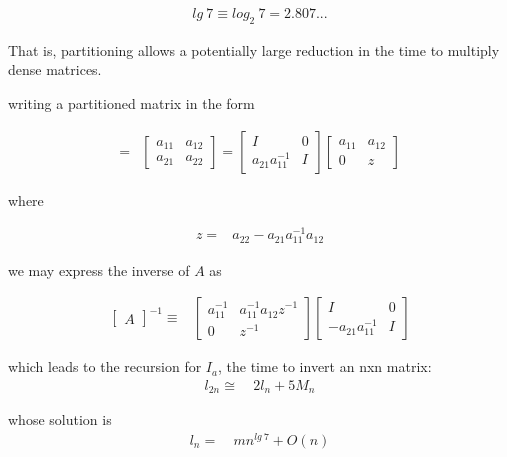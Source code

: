 \begin{align*}
    lg\ 7 \equiv log_{2}\ 7 = 2.807...
\end{align*}

That is, partitioning allows a potentially large reduction in the time to multiply dense matrices.

 writing a partitioned matrix in the form

\begin{align}
    [A]                     =& 
    \begin{bmatrix}
      a_{11} & a_{12} \\
      a_{21} & a_{22}
    \end{bmatrix}
    =
    \begin{bmatrix}
      I                 & 0 \\
      a_{21}^{}a_{11}^{-1} & I
    \end{bmatrix}
    \begin{bmatrix}
      a_{11} & a_{12} \\
      0      & z
    \end{bmatrix}
\end{align}

where

\begin{align}
    z =& a_{22} - a_{21}a_{11}^{-1}a_{12}
\end{align}

we may express the inverse of $A$ as

\begin{align}
    \begin{bmatrix}
      A
    \end{bmatrix}^{-1} \equiv&
    \begin{bmatrix}
      a_{11}^{-1} & a_{11}^{-1}a_{12}^{}z^{-1} \\
      0           & z^{-1}
    \end{bmatrix}
    \begin{bmatrix}
      I                     & 0 \\
      -a_{21}^{}a_{11}^{-1} & I
    \end{bmatrix}
\end{align}

which leads to the recursion for $I_{a}$, the time to invert an nxn matrix:
\begin{align}
l_{2n} \cong&\ 2l_{n} + 5M_{n}
\end{align} 

whose solution is
\begin{align}
l_{n} =&\ mn^{lg\ 7} + O(n)
\end{align}

